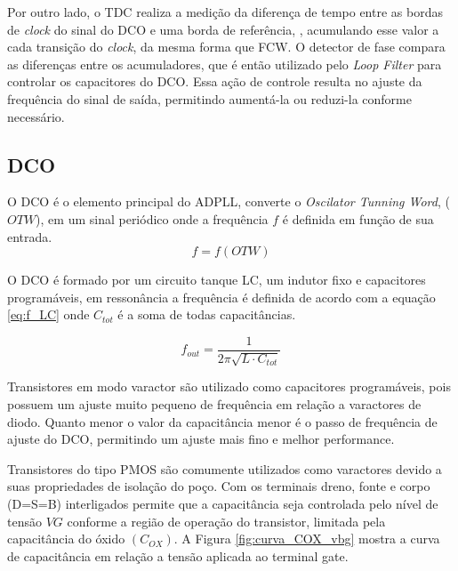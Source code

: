 Por outro lado, o TDC realiza a medição da diferença de tempo entre as bordas de \textit{clock} do sinal do DCO e uma borda de referência, , acumulando esse valor a cada transição do \textit{clock}, da mesma forma que FCW. O detector de fase compara as diferenças entre os acumuladores, que é então utilizado pelo \textit{Loop Filter} para controlar os capacitores do DCO. Essa ação de controle resulta no ajuste da frequência do sinal de saída, permitindo aumentá-la ou reduzi-la conforme necessário.

\subsection{DCO}

O DCO é o elemento principal do ADPLL, converte o \textit{Oscilator Tunning Word}, ($OTW$), em um sinal periódico onde a frequência $f$ é definida em função de sua entrada.
\begin{equation}
	f = f(OTW)
	\label{eq:f_OTW}
\end{equation}

O DCO é formado por um circuito tanque LC, um indutor fixo e capacitores programáveis, em ressonância a frequência é definida de acordo com a equação \ref{eq:f_LC} onde $C_{tot}$ é a soma de todas capacitâncias.

\begin{equation}
	f_{out} = \frac{1}{2 \pi \sqrt{L \cdot C_{tot}}}
	\label{eq:f_LC}
\end{equation}

Transistores em modo varactor são utilizado como capacitores programáveis, pois possuem um ajuste muito pequeno de frequência em relação a varactores de diodo. Quanto menor o valor da capacitância menor é o  passo de frequência de ajuste do DCO, permitindo um ajuste mais fino e melhor performance. 

Transistores do tipo PMOS são comumente utilizados como varactores devido a suas propriedades de isolação do poço. Com os terminais dreno, fonte e corpo (D=S=B) interligados permite que a capacitância seja controlada pelo nível de tensão $VG$ conforme a região de operação do transistor, limitada pela capacitância do óxido $(C_{OX})$. A Figura \ref{fig:curva_COX_vbg} mostra a curva de capacitância em relação a tensão aplicada ao terminal gate.

